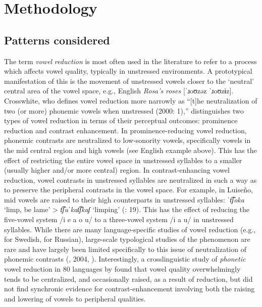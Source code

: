 \section{ Methodology}\label{sec:6.2}
\subsection{ Patterns considered}\label{sec:6.2.1}

  The term \textit{vowel} \textit{reduction} is most often used in the literature to refer to a process which affects vowel quality, typically in unstressed environments. A prototypical manifestation of this is the movement of unstressed vowels closer to the ‘neutral’ central area of the vowel space, e.g., English \textit{Rosa’s} \textit{roses} [\textit{ˈ}ɹoʊzəz \textit{ˈ}ɹoʊzɨz]. Crosswhite, who defines vowel reduction more narrowly as “[t]he neutralization of two (or more) phonemic vowels when unstressed (2000: 1),” distinguishes two types of vowel reduction in terms of their perceptual outcomes: prominence reduction and contrast enhancement. In prominence-reducing vowel reduction, phonemic contrasts are neutralized to low-sonority vowels, specifically vowels in the mid central region and high vowels (see English example above). This has the effect of restricting the entire vowel space in unstressed syllables to a smaller (usually higher and/or more central) region. In contrast-enhancing vowel reduction, vowel contrasts in unstressed syllables are neutralized in such a way as to preserve the peripheral contrasts in the vowel space. For example, in Luiseño, mid vowels are raised to their high counterparts in unstressed syllables: \textit{ˈt͡ʃoka} ‘limp, be lame’ > \textit{t͡ʃuˈkat͡ʃkaʃ} ‘limping’ (\citealt{MunroBenson1973}: 19). This has the effect of reducing the five-vowel system /i e a o u/ to a three-vowel system /i a u/ in unstressed syllables. While there are many language-specific studies of vowel reduction (e.g., \citealt{Lindblom1963} for Swedish, \citealt{PadgettTabain2005} for Russian), large-scale typological studies of the phenomenon are rare and have largely been limited specifically to this issue of neutralization of phonemic contrasts (\citealt{Crosswhite2001}, 2004, \citealt{Barnes2006}). Interestingly, a crosslinguistic study of \textit{phonetic} vowel reduction in 80 languages by \citet{KapatsinskiEtAl2019} found that vowel quality overwhelmingly tends to be centralized, and occasionally raised, as a result of reduction, but did not find synchronic evidence for contrast-enhancement involving both the raising and lowering of vowels to peripheral qualities.

